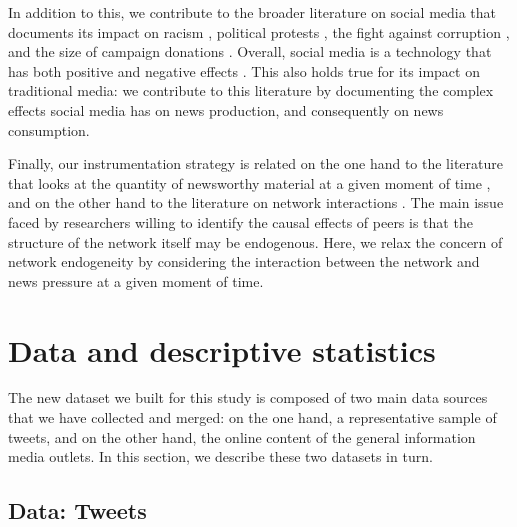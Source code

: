 In addition to this, we contribute to the broader literature on social media that documents its impact on racism \citep{MullerSchwarz2019}, political protests \citep{EnikolopovMakarinPetrova2020}, the fight against corruption \citep{Enikolopovetal2018}, and the size of campaign donations \citep{Petrovaetal2017}. Overall, social media is a technology that has both positive and negative effects \citep{Allcottetal2020}. This also holds true for its impact on traditional media: we contribute to this literature by documenting the complex effects social media has on news production, and consequently on news consumption.

Finally, our instrumentation strategy is related on the one hand to the literature that looks at the quantity of newsworthy material at a given moment of time \citep[e.g.][]{EisenseeStromberg2007,DjourelovaDurante2019}, and on the other hand to the literature on network interactions \citep[see][for a recent survey]{BramoulleDjebbariFortin2020}. The main issue faced by researchers willing to identify the causal effects of peers is that the structure of the network itself may be endogenous. Here, we relax the concern of network endogeneity by considering the interaction between the network and news pressure at a given moment of time.





\section{Data and descriptive statistics\label{Sec:DataAlgorithms}}

The new dataset we built for this study is composed of two main data sources that we have collected and merged: on the one hand, a representative sample of tweets, and on the other hand, the online content of the general information media outlets. In this section, we describe these two datasets in turn.


\subsection{Data: Tweets\label{Sec:DataTweets}}

